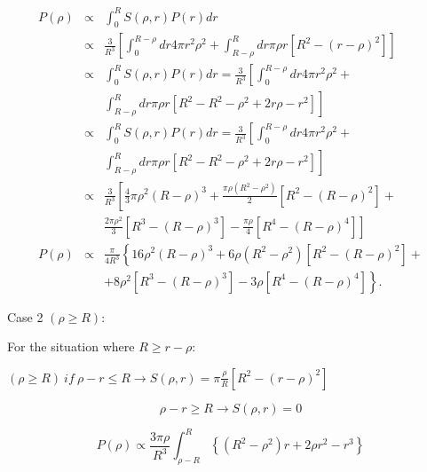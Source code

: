 \begin{eqnarray}
P\left(\rho\right) & \propto & \int_{0}^{R}S\left(\rho,r\right)P\left(r\right)dr\\
& \propto & \frac{3}{R^{3}}\left[\int_{0}^{R-\rho}dr4\pi r^{2}\rho^{2}+\int_{R-\rho}^{R}dr\pi\rho r\left[R^{2}-\left(r-\rho\right)^{2}\right]\right]\\
& \propto & \int_{0}^{R}S\left(\rho,r\right)P\left(r\right)dr=\frac{3}{R^{3}}\left[\int_{0}^{R-\rho}dr4\pi r^{2}\rho^{2}+\right.\nonumber\\
 & &\left.\int_{R-\rho}^{R}dr\pi\rho r\left[R^{2}-R^{2}-\rho^{2}+2r\rho-r^{2}\right]\right]\\
 & \propto & \int_{0}^{R}S\left(\rho,r\right)P\left(r\right)dr=\frac{3}{R^{3}}\left[\int_{0}^{R-\rho}dr4\pi r^{2}\rho^{2}+\right.\nonumber\\
 & &\left.\int_{R-\rho}^{R}dr\pi\rho r\left[R^{2}-R^{2}-\rho^{2}+2r\rho-r^{2}\right]\right]\\
 & \propto & \frac{3}{R^{3}}\left[\frac{4}{3}\pi\rho^{2}\left(R-\rho\right)^{3}+\frac{\pi\rho\left(R^{2}-\rho^{2}\right)}{2}\left[R^{2}-\left(R-\rho\right)^{2}\right]+\right.\nonumber\\
& & \left. \frac{2\pi\rho^{2}}{3}\left[R^{3}-\left(R-\rho\right)^{3}\right] -\frac{\pi\rho}{4}\left[R^{4}-\left(R-\rho\right)^{4}\right]\right]\\
P\left(\rho\right)& \propto & \frac{\pi}{4R^{3}}\left\{ 16\rho^{2}\left(R-\rho\right)^{3}+6\rho\left(R^{2}-\rho^{2}\right)\left[R^{2}-\left(R-\rho\right)^{2}\right]+\right.\nonumber\\
& &\left. +8\rho^{2}\left[R^{3}-\left(R-\rho\right)^{3}\right]-3\rho\left[R^{4}-\left(R-\rho\right)^{4}\right]\right\}.
\end{eqnarray}

Case 2 $\left(\rho\geq R\right)$:

For the situation where $R\geq r - \rho$: 


 $\left(\rho\geq R\right)\ if\ \rho-r\leq R\rightarrow S\left(\rho,r\right)=\pi\frac{\rho}{R}\left[R^{2}-\left(r-\rho\right)^{2}\right]$

\[
\rho-r\geq R\rightarrow S\left(\rho,r\right)=0
\]


\[
P\left(\rho\right)\propto\frac{3\pi\rho}{R^{3}}\int_{\rho-R}^{R}\left\{ \left(R^{2}-\rho^{2}\right)r+2\rho r^{2}-r^{3}\right\} 
\]


